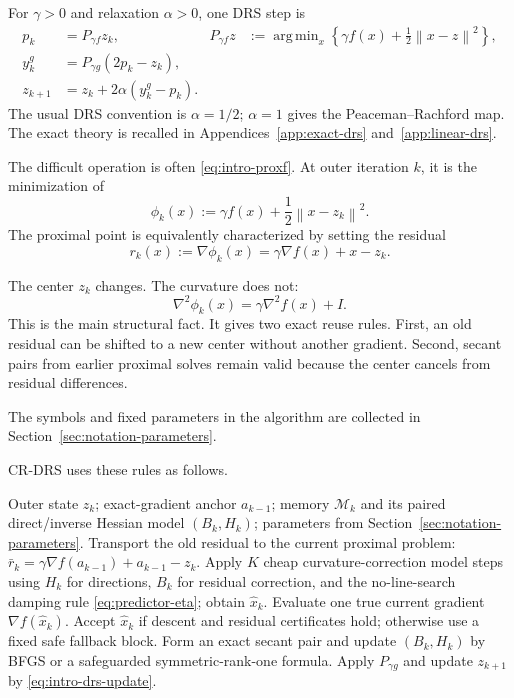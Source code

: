 \documentclass[10pt,leqno]{amsart}
\numberwithin{equation}{section}
\numberwithin{algorithm}{section}
\theoremstyle{remark}
\DeclareMathOperator{\argmin}{arg\,min}
\newcommand{\norm}[1]{\left\lVert #1 \right\rVert}
\newcommand{\grad}{\nabla}
\begin{document}
For $\gamma>0$ and relaxation $\alpha>0$, one DRS step is
\begin{align}
    p_k&=P_{\gamma f}z_k,
    &P_{\gamma f}z&:=\argmin_x\left\{\gamma f(x)+\frac12\norm{x-z}^2\right\},
    \label{eq:intro-proxf}\\
    y_k^g&=P_{\gamma g}(2p_k-z_k),
    \label{eq:intro-proxg}\\
    z_{k+1}&=z_k+2\alpha(y_k^g-p_k).
    \label{eq:intro-drs-update}
\end{align}
The usual DRS convention is $\alpha=1/2$; $\alpha=1$ gives the Peaceman--Rachford map.  The exact theory is recalled in Appendices~\ref{app:exact-drs} and~\ref{app:linear-drs}.

The difficult operation is often \eqref{eq:intro-proxf}.  At outer iteration $k$, it is the minimization of
\begin{equation}
\label{eq:intro-prox-family}
    \phi_k(x):=\gamma f(x)+\frac12\norm{x-z_k}^2.
\end{equation}
The proximal point is equivalently characterized by setting the residual
\begin{equation}
\label{eq:intro-prox-family-res}
    r_k(x):=\grad\phi_k(x)=\gamma\grad f(x)+x-z_k.
\end{equation}

The center $z_k$ changes.  The curvature does not:
\begin{equation}
\label{eq:intro-curvature-invariance}
    \grad^2\phi_k(x)=\gamma\grad^2 f(x)+I.
\end{equation}
This is the main structural fact.  It gives two exact reuse rules.  First, an old residual can be shifted to a new center without another gradient.  Second, secant pairs from earlier proximal solves remain valid because the center cancels from residual differences.

The symbols and fixed parameters in the algorithm are collected in Section~\ref{sec:notation-parameters}. 

CR-DRS uses these rules as follows.  

\begin{algorithm}[t]
\caption{CR-DRS at a high level}
\label{alg:high-level-crdrs}
\begin{algorithmic}[1]
\REQUIRE Outer state $z_k$; exact-gradient anchor $a_{k-1}$; memory $\mathcal M_k$ and its paired direct/inverse Hessian model $(B_k,H_k)$; parameters from Section~\ref{sec:notation-parameters}.
 Transport the old residual to the current proximal problem:
       $\bar r_k=\gamma\grad f(a_{k-1})+a_{k-1}-z_k$.
\STATE Apply $K$ cheap curvature-correction model steps using $H_k$ for directions, $B_k$ for residual correction, and the no-line-search damping rule \eqref{eq:predictor-eta}; obtain $\widehat x_k$.
 Evaluate one true current gradient $\grad f(\widehat x_k)$.
\STATE Accept $\widehat x_k$ if descent and residual certificates hold; otherwise use a fixed safe fallback block.
\STATE Form an exact secant pair and update $(B_k,H_k)$ by BFGS or a safeguarded symmetric-rank-one formula.
\STATE Apply $P_{\gamma g}$ and update $z_{k+1}$ by \eqref{eq:intro-drs-update}.
\end{algorithmic}
\end{algorithm}
\end{document}
